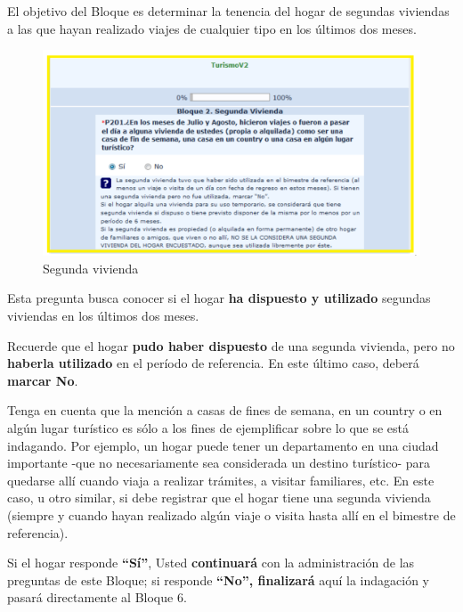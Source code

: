 \documentclass[
  openany]{book}
\begin{document}
El objetivo del Bloque es determinar la tenencia del hogar de segundas viviendas a las que hayan realizado viajes de cualquier tipo en los últimos dos meses.

\begin{figure}

{\centering \includegraphics[width=1\linewidth]{imagenes/figura6-65} 

}

\caption{Segunda vivienda}\label{fig:respuesfinal}
\end{figure}

Esta pregunta busca conocer si el hogar \textbf{ha dispuesto y utilizado} segundas viviendas en los últimos dos meses.

Recuerde que el hogar \textbf{pudo haber dispuesto} de una segunda vivienda, pero no \textbf{haberla utilizado} en el período de referencia. En este último caso, deberá \textbf{marcar No}.

Tenga en cuenta que la mención a casas de fines de semana, en un country o en algún lugar turístico es sólo a los fines de ejemplificar sobre lo que se está indagando. Por ejemplo, un hogar puede tener un departamento en una ciudad importante -que no necesariamente sea considerada un destino turístico- para quedarse allí cuando viaja a realizar trámites, a visitar familiares, etc. En este caso, u otro similar, si debe registrar que el hogar tiene una segunda vivienda (siempre y cuando hayan realizado algún viaje o visita hasta allí en el bimestre de referencia).

Si el hogar responde \textbf{``Sí''}, Usted \textbf{continuará} con la administración de las preguntas de este Bloque; si responde \textbf{``No'', finalizará} aquí la indagación y pasará directamente al Bloque 6.
\end{document}
